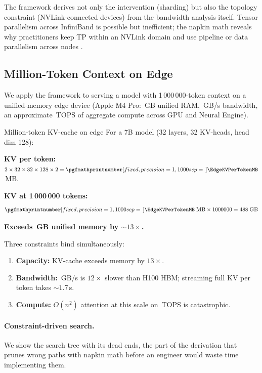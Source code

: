\documentclass[10pt,twocolumn]{article}
\newcommand{\cval}[1]{\pgfmathprintnumber[fixed, precision=1, 1000 sep={\,}]{#1}}
\newcommand{\cvalint}[1]{\pgfmathprintnumber[fixed, precision=0, 1000 sep={\,}]{#1}}
\newcommand{\EdgeCtxTokens}{1\,000\,000}
\newcommand{\EdgeCtxTokensRaw}{1000000}
\newcommand{\EdgeKVTotalGB}{488}  %
\begin{document}
The framework derives not only the intervention (sharding) but also the topology constraint (NVLink-connected devices) from the bandwidth analysis itself. Tensor parallelism across InfiniBand is possible but inefficient; the napkin math reveals why practitioners keep TP within an NVLink domain and use pipeline or data parallelism across nodes \citep{narayanan2021}.

\subsection{Million-Token Context on Edge}
\label{sec:edge-analysis}

We apply the framework to serving a model with \EdgeCtxTokens{}-token context on a unified-memory edge device (Apple M4 Pro: \cvalint{\EdgeRAMGB}\,GB unified RAM, \cvalint{\EdgeBWGBs}\,GB/s bandwidth, an approximate \cvalint{\EdgeTFLOPS}\,TOPS of aggregate compute across GPU and Neural Engine).

\begin{napkinmath}{Million-token KV-cache on edge}
For a 7B model (32 layers, 32 KV-heads, head dim 128):

\textbf{KV per token:} $2 \times 32 \times 32 \times 128 \times 2 = \cval{\EdgeKVPerTokenMB}$\,MB.

\textbf{KV at \EdgeCtxTokens{} tokens:}
\[
\cval{\EdgeKVPerTokenMB}\;\text{MB} \times \EdgeCtxTokensRaw{} = \EdgeKVTotalGB{}\;\text{GB}
\]

\textbf{Exceeds \cvalint{\EdgeRAMGB}\,GB unified memory by ${\sim}13\times$.}

Three constraints bind simultaneously:
\begin{enumerate}[nosep]
\item \textbf{Capacity:} KV-cache exceeds memory by $13\times$.
\item \textbf{Bandwidth:} \cvalint{\EdgeBWGBs}\,GB/s is $12\times$ slower than H100 HBM; streaming full KV per token takes ${\sim}1.7$\,s.
\item \textbf{Compute:} $O(n^2)$ attention at this scale on \cvalint{\EdgeTFLOPS}\,TOPS is catastrophic.
\end{enumerate}
\end{napkinmath}

\paragraph{Constraint-driven search.} We show the search tree with its dead ends, the part of the derivation that prunes wrong paths with napkin math before an engineer would waste time implementing them.
\end{document}
